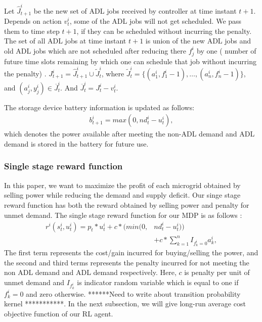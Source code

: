  Let $\widehat J_{t+1}^{i}$ be the new set of ADL jobs received by controller at time instant $t+1$. Depends on action $v_{t}^{i}$, some of the ADL jobs will not get scheduled. We pass them to time step $t+1$, if they can be scheduled without incurring the penalty. The set of all ADL jobs at time instant $t+1$ is union of the new ADL jobs and old ADL jobs which are not scheduled after reducing there  $f_{j}^{i}$ by one ( number of future time slots remaining by which one can schedule that job without incurring the penalty) .
$J_{t+1}^{i} = \widehat J_{t+1}^{i} \cup \widetilde J_{t}^{i}$, where $\widetilde J_{t}^{i} =  \{(a_{1}^{i}, f_{1}^{i} - 1),\ldots,(a_{n}^{i}, f_{n}^{i} - 1)\}$, and $ (a_{j}^{i}, y_{j}^{i}) \in \overline J_{t}^{i}$. And $\overline J_{t}^{i} = J_{t}^{i} - v_{t}^{i}$.

The storage device battery information is updated as follows:
\begin{align}
b_{t+1}^{i} = max(0,nd_{t}^{i} - u_{t}^{i}),
\end{align}
which denotes the power available after meeting the non-ADL demand and ADL demand is stored in the battery for future use.
\subsubsection{Single stage reward function}
In this paper, we want to maximize the profit of each microgrid obtained by selling power while reducing the demand and supply deficit. Our singe stage reward function has both the reward obtained by selling power and penalty for unmet demand. The single stage reward  function for our MDP is as follows :
\begin{align}
r^{i}(s_t^i,u_t^i) = p_{t}*u_{t}^{i} + c*(min(0,&nd_{t}^{i} - u_{t}^{i}))  \nonumber\\ &+ c* \sum_{k =1}^{n} I_{f_{k}^{i} = 0} a_{k}^{i} ,
\end{align}
The first term represents the cost/gain incurred for  buying/selling the power, and the second and third terms represents the penalty  incurred for not meeting the non ADL demand and ADL demand respectively. Here, $c$ is penalty per unit of unmet demand and $I_{f_{k}^{i}}$ is indicator random variable which is equal to one if $f_{k}^{i} =0$ and zero otherwise. 
******Need to write about transition probability kernel ***********. In the next subsection, we will give long-run average cost objective function of our RL agent. 
